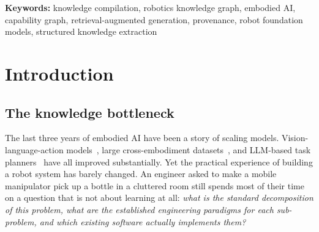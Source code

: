\documentclass[10pt,a4paper]{article}
\newcommand{\eb}{\textsc{Entropy Box}\xspace}
\begin{document}
\begin{abstract}
We describe the architecture, the compilation algorithm, the multi-graph schema
and the runtime; walk through a fully-traced compilation of the
\texttt{a\_star\_path\_planning} topic from raw literature to four distinct
executable chains grounded in Nav2, PythonRobotics and four foundational
papers; report system statistics; and state plainly what we have not
established --- notably a head-to-head comparison against query-time baselines,
which we argue for but do not claim. We also
distinguish our use of ``knowledge compilation'' from the established
tractable-representation sense of Darwiche and Marquis, and \eb\ from search
engines, RAG systems and vector databases. We report two empirical results obtained from the system's own
records: embedding similarity, once it has flagged a candidate duplicate pair,
carries too little signal to decide the merge (precision 0.069, AUC 0.629), and
no threshold fixes this --- which turns a conservative adjudication stage from a
design preference into a requirement; and 98.29\% of the artifact's evidence
citations resolve to a retrievable document, a metric we argue should be standard
for generated knowledge graphs. The artifact is publicly browsable and a
read-only retrieval API is open.
\end{abstract}

\vspace{0.4em}
\noindent\textbf{Keywords:} knowledge compilation, robotics knowledge graph,
embodied AI, capability graph, retrieval-augmented generation, provenance,
robot foundation models, structured knowledge extraction

\section{Introduction}
\label{sec:intro}

\subsection{The knowledge bottleneck}

The last three years of embodied AI have been a story of scaling models. Vision-language-action
models~\cite{brohan2023rt2,driess2023palme}, large cross-embodiment
datasets~\cite{oxe2023}, and LLM-based task
planners~\cite{ahn2022saycan} have all improved substantially. Yet the
practical experience of building a robot system has barely changed. An engineer
asked to make a mobile manipulator pick up a bottle in a cluttered room still
spends most of their time on a question that is not about learning at all:
\emph{what is the standard decomposition of this problem, what are the
established engineering paradigms for each sub-problem, and which existing
software actually implements them?}
\end{document}
